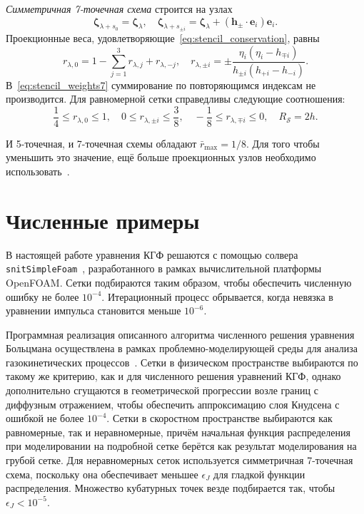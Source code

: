 \documentclass[
aps,%
12pt,%
final,%
notitlepage,%
oneside,%
onecolumn,%
nobibnotes,%
nofootinbib,%
superscriptaddress,%
noshowpacs,%
showkeys,%
tightenlines,%
centertags]%
{revtex4}
\newcommand{\bzeta}{\boldsymbol{\zeta}}
\newcommand{\bh}{\boldsymbol{h}}
\newcommand{\be}{\boldsymbol{e}}
\begin{document}
\emph{Симметричная 7-точечная схема} строится на узлах
\begin{equation}\label{eq:stencil_nodes7}
    \bzeta_{\lambda+s_0} = \bzeta_{\lambda}, \quad
    \bzeta_{\lambda+s_{\pm i}} = \bzeta_{\lambda} + (\bh_\pm\cdot \be_i)\be_i.
\end{equation}
Проекционные веса, удовлетворяющие~\eqref{eq:stencil_conservation}, равны
\begin{equation}\label{eq:stencil_weights7}
    r_{\lambda,0} = 1 - \sum_{j=1}^3 r_{\lambda,j} + r_{\lambda,-j}, \quad
    r_{\lambda,\pm i} = \pm\frac{\eta_i(\eta_i - h_{\mp i})}{h_{\pm i}(h_{+i}-h_{-i})}.
\end{equation}
В~\eqref{eq:stencil_weights7} суммирование по повторяющимся индексам не производится.
Для равномерной сетки справедливы следующие соотношения:
\begin{equation}\label{eq:weights_ranges7}
    \frac14 \leq r_{\lambda,0} \leq 1, \quad
    0 \leq r_{\lambda,\pm i} \leq \frac38, \quad
    -\frac18 \leq r_{\lambda,\mp i} \leq 0, \quad
    R_\mathcal{S} = 2h.
\end{equation}

И 5-точечная, и 7-точечная схемы обладают \(\bar{r}_{\max}=1/8\).
Для того чтобы уменьшить это значение, ещё больше проекционных узлов необходимо использовать~\citep{Dodulad2012}.

\section{Численные примеры}

В настоящей работе уравнения КГФ решаются с помощью солвера \verb+snitSimpleFoam+~\cite{Rogozin2014},
разработанного в рамках вычислительной платформы OpenFOAM\textregistered{}.
Сетки подбираются таким образом, чтобы обеспечить численную ошибку не более \(10^{-4}\).
Итерационный процесс обрывается, когда невязка в уравнении импульса становится меньше \(10^{-6}\).

Программная реализация описанного алгоритма численного решения уравнения Больцмана
осуществлена в рамках проблемно-моделирующей среды
для анализа газокинетических процессов~\cite{Kloss2011, Kloss2012}.
Сетки в физическом пространстве выбираются по такому же критерию, как и для численного решения уравнений КГФ,
однако дополнительно сгущаются в геометрической прогрессии возле границ с диффузным отражением,
чтобы обеспечить аппроксимацию слоя Кнудсена с ошибкой не более \(10^{-4}\).
Сетки в скоростном пространстве выбираются как равномерные, так и неравномерные,
причём начальная функция распределения при моделировании на подробной сетке берётся
как результат моделирования на грубой сетке.
Для неравномерных сеток используется симметричная 7-точечная схема, поскольку она
обеспечивает меньшее \(\epsilon_J\) для гладкой функции распределения.
Множество кубатурных точек везде подбирается так, чтобы \(\epsilon_J < 10^{-5}\).
\end{document}
